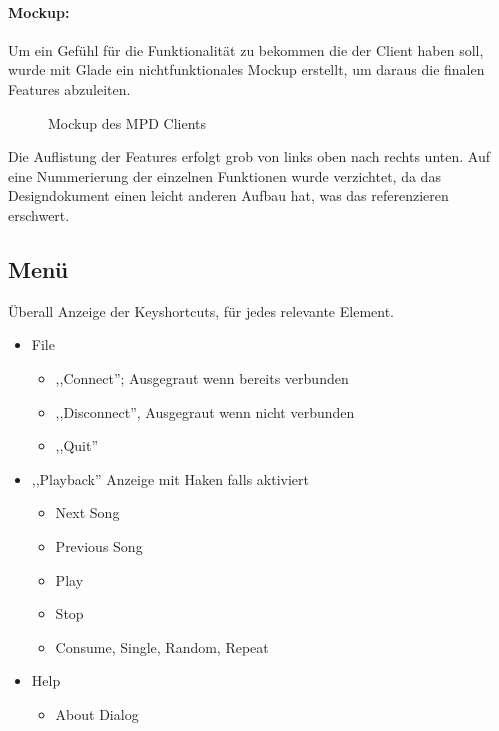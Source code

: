 \paragraph{Mockup:}
Um ein Gefühl für die Funktionalität zu bekommen die der Client haben soll, wurde mit Glade ein nichtfunktionales Mockup erstellt, 
um daraus die finalen Features abzuleiten. 

\begin{figure}[h!]
    \caption{Mockup des MPD Clients}
    \label{p_mockup}
\end{figure}

Die Auflistung der Features erfolgt grob von links oben nach rechts unten. Auf eine Nummerierung der einzelnen Funktionen
wurde verzichtet, da das Designdokument einen leicht anderen Aufbau hat, was das referenzieren erschwert. 

\subsection{Menü}
Überall Anzeige der Keyshortcuts, für jedes relevante Element.
\begin{itemize}
\item File
  \begin{itemize}
  \item ,,Connect''; Ausgegraut wenn bereits verbunden
  \item ,,Disconnect'', Ausgegraut wenn nicht verbunden
  \item ,,Quit''
  \end{itemize} 
\item ,,Playback'' Anzeige mit Haken falls aktiviert 
  \begin{itemize}
  \item Next Song
  \item Previous Song
  \item Play
  \item Stop
  \item Consume, Single, Random, Repeat 
  \end{itemize}   
\item Help
  \begin{itemize}
  \item About Dialog
  \end{itemize}
\end{itemize}

